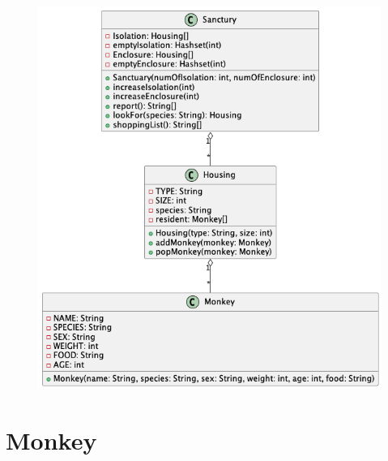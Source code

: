\documentclass[12pt]{amsart}
\title{}
\author{}
\date{} %
\begin{document}
\begin{figure}[H] %
\centering %
\includegraphics[width=1\textwidth]{uml.png} %
\end{figure}

\newpage

\section{Monkey}
\end{document}
